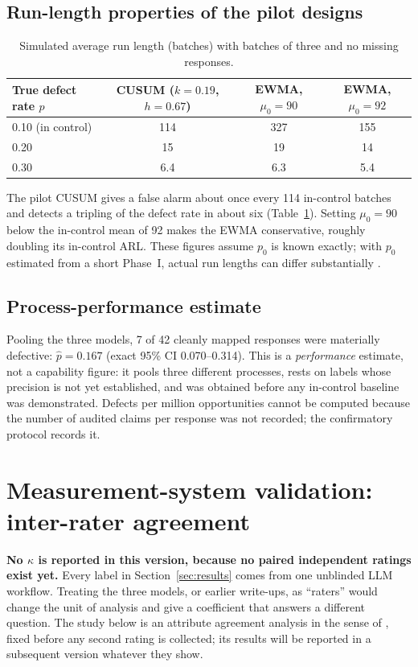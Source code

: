 \documentclass[11pt]{article}
\begin{document}
\subsection{Run-length properties of the pilot designs}
\begin{table}[!htbp]
\centering\small
\caption{Simulated average run length (batches) with batches of three and no missing responses.}\label{tab:arl}
\begin{tabular}{@{}lccc@{}}
\toprule
True defect rate $p$ & CUSUM ($k=0.19$, $h=0.67$) & EWMA, $\mu_0=90$ & EWMA, $\mu_0=92$ \\
\midrule
0.10 (in control) & 114 & 327 & 155 \\
0.20 & 15 & 19 & 14 \\
0.30 & 6.4 & 6.3 & 5.4 \\
\bottomrule
\end{tabular}
\end{table}
The pilot CUSUM gives a false alarm about once every 114 in-control batches and detects a tripling of the defect rate in about six (Table~\ref{tab:arl}). Setting $\mu_0=90$ below the in-control mean of 92 makes the EWMA conservative, roughly doubling its in-control ARL. These figures assume $p_0$ is known exactly; with $p_0$ estimated from a short Phase~I, actual run lengths can differ substantially \citep{jensen2006}.

\subsection{Process-performance estimate}\label{sec:performance}
Pooling the three models, 7 of 42 cleanly mapped responses were materially defective: $\hat p=0.167$ (exact 95\% CI 0.070--0.314). This is a \emph{performance} estimate, not a capability figure: it pools three different processes, rests on labels whose precision is not yet established, and was obtained before any in-control baseline was demonstrated. Defects per million opportunities cannot be computed because the number of audited claims per response was not recorded; the confirmatory protocol records it.

\section{Measurement-system validation: inter-rater agreement}\label{sec:kappa}
\textbf{No $\kappa$ is reported in this version, because no paired independent ratings exist yet.} Every label in Section~\ref{sec:results} comes from one unblinded LLM workflow. Treating the three models, or earlier write-ups, as ``raters'' would change the unit of analysis and give a coefficient that answers a different question. The study below is an attribute agreement analysis in the sense of \citet{aiag2010msa}, fixed before any second rating is collected; its results will be reported in a subsequent version whatever they show.
\end{document}
